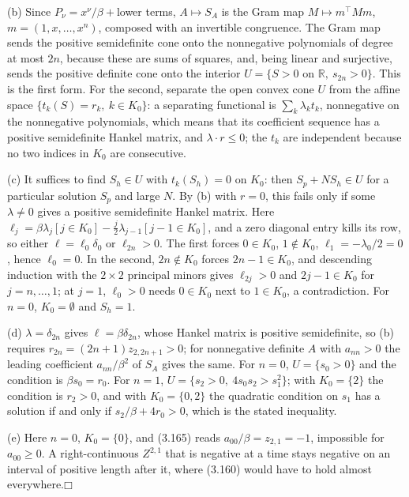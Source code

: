 \documentclass[11pt]{article}
\providecommand{\square}{\mdlgwhtsquare}
\begin{document}
(b) Since \(P_\nu=x^\nu/\beta+\)lower terms, \(A\mapsto S_A\) is the Gram map \(M\mapsto m^\top Mm\), \(m=(1,x,\dots,x^n)\), composed with an invertible congruence. The Gram map sends the positive semidefinite cone onto the nonnegative polynomials of degree at most \(2n\), because these are sums of squares, and, being linear and surjective, sends the positive definite cone onto the interior \(U=\{S>0\text{ on }\mathbb R,\ s_{2n}>0\}\). This is the first form. For the second, separate the open convex cone \(U\) from the affine space \(\{t_k(S)=r_k,\ k\in K_0\}\): a separating functional is \(\sum_k\lambda_kt_k\), nonnegative on the nonnegative polynomials, which means that its coefficient sequence has a positive semidefinite Hankel matrix, and \(\lambda\cdot r\le0\); the \(t_k\) are independent because no two indices in \(K_0\) are consecutive.

(c) It suffices to find \(S_h\in U\) with \(t_k(S_h)=0\) on \(K_0\): then \(S_p+NS_h\in U\) for a particular solution \(S_p\) and large \(N\). By (b) with \(r=0\), this fails only if some \(\lambda\neq0\) gives a positive semidefinite Hankel matrix. Here \(\ell_j=\beta\lambda_j[j\in K_0]-\tfrac j2\lambda_{j-1}[j-1\in K_0]\), and a zero diagonal entry kills its row, so either \(\ell=\ell_0\delta_0\) or \(\ell_{2n}>0\). The first forces \(0\in K_0\), \(1\notin K_0\), \(\ell_1=-\lambda_0/2=0\), hence \(\ell_0=0\). In the second, \(2n\notin K_0\) forces \(2n-1\in K_0\), and descending induction with the \(2\times2\) principal minors gives \(\ell_{2j}>0\) and \(2j-1\in K_0\) for \(j=n,\dots,1\); at \(j=1\), \(\ell_0>0\) needs \(0\in K_0\) next to \(1\in K_0\), a contradiction. For \(n=0\), \(K_0=\emptyset\) and \(S_h=1\).

(d) \(\lambda=\delta_{2n}\) gives \(\ell=\beta\delta_{2n}\), whose Hankel matrix is positive semidefinite, so (b) requires \(r_{2n}=(2n+1)z_{2,2n+1}>0\); for nonnegative definite \(A\) with \(a_{nn}>0\) the leading coefficient \(a_{nn}/\beta^2\) of \(S_A\) gives the same. For \(n=0\), \(U=\{s_0>0\}\) and the condition is \(\beta s_0=r_0\). For \(n=1\), \(U=\{s_2>0,\ 4s_0s_2>s_1^2\}\); with \(K_0=\{2\}\) the condition is \(r_2>0\), and with \(K_0=\{0,2\}\) the quadratic condition on \(s_1\) has a solution if and only if \(s_2/\beta+4r_0>0\), which is the stated inequality.

(e) Here \(n=0\), \(K_0=\{0\}\), and (3.165) reads \(a_{00}/\beta=z_{2,1}=-1\), impossible for \(a_{00}\ge0\). A right-continuous \(Z^{2,1}\) that is negative at a time stays negative on an interval of positive length after it, where (3.160) would have to hold almost everywhere.\hfill$\square$
\end{document}
